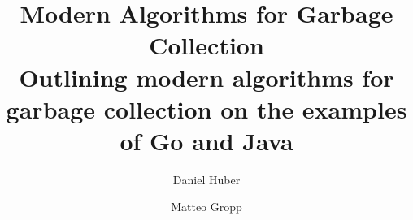 

\title{Modern Algorithms for Garbage Collection \\ \small{Outlining modern algorithms for garbage collection on the examples of Go and Java}}
\author{Daniel Huber \and Matteo Gropp}


    \maketitle
    \tableofcontents

    
    
    
    
    

    \printbibliography

